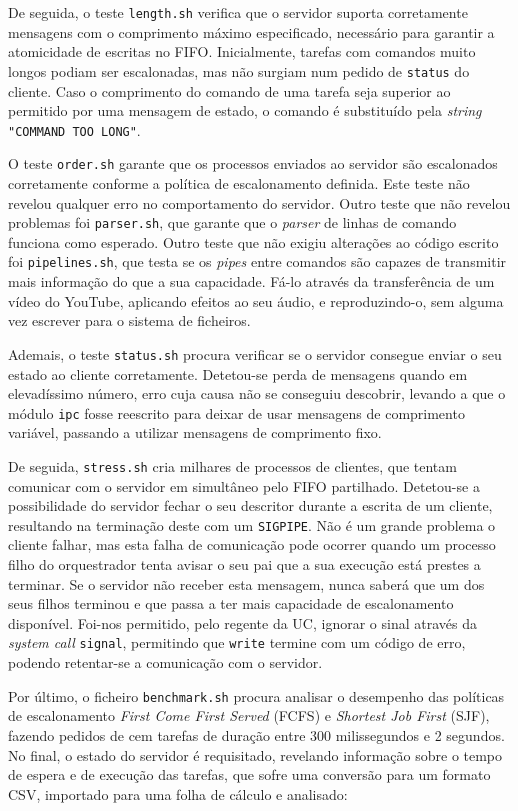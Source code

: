 \documentclass[11pt]{article}
\begin{document}
De seguida, o teste \texttt{length.sh} verifica que o servidor suporta corretamente mensagens com o
comprimento máximo especificado, necessário para garantir a atomicidade de escritas no FIFO.
Inicialmente, tarefas com comandos muito longos podiam ser escalonadas, mas não surgiam num pedido
de \texttt{status} do cliente. Caso o comprimento do comando de uma tarefa seja superior ao
permitido por uma mensagem de estado, o comando é substituído pela \emph{string}
\texttt{"COMMAND TOO LONG"}.

O teste \texttt{order.sh} garante que os processos enviados ao servidor são escalonados corretamente
conforme a política de escalonamento definida. Este teste não revelou qualquer erro no comportamento
do servidor. Outro teste que não revelou problemas foi \texttt{parser.sh}, que garante que o
\emph{parser} de linhas de comando funciona como esperado. Outro teste que não exigiu alterações ao
código escrito foi \texttt{pipelines.sh}, que testa se os \emph{pipes} entre comandos são capazes de
transmitir mais informação do que a sua capacidade. Fá-lo através da transferência de um vídeo do
YouTube, aplicando efeitos ao seu áudio, e reproduzindo-o, sem alguma vez escrever para o sistema de
ficheiros.

Ademais, o teste \texttt{status.sh} procura verificar se o servidor consegue enviar o seu estado ao
cliente corretamente. Detetou-se perda de mensagens quando em elevadíssimo número, erro cuja causa
não se conseguiu descobrir, levando a que o módulo \texttt{ipc} fosse reescrito para deixar de usar
mensagens de comprimento variável, passando a utilizar mensagens de comprimento fixo.

De seguida, \texttt{stress.sh} cria milhares de processos de clientes, que tentam comunicar com o
servidor em simultâneo pelo FIFO partilhado. Detetou-se a possibilidade do servidor fechar o seu
descritor durante a escrita de um cliente, resultando na terminação deste com um \texttt{SIGPIPE}.
Não é um grande problema o cliente falhar, mas esta falha de comunicação pode ocorrer quando um
processo filho do orquestrador tenta avisar o seu pai que a sua execução está prestes a terminar.
Se o servidor não receber esta mensagem, nunca saberá que um dos seus filhos terminou e que passa a
ter mais capacidade de escalonamento disponível. Foi-nos permitido, pelo regente da UC, ignorar o
sinal através da \emph{system call} \texttt{signal}, permitindo que \texttt{write} termine com um
código de erro, podendo retentar-se a comunicação com o servidor.

Por último, o ficheiro \texttt{benchmark.sh} procura analisar o desempenho das políticas de
escalonamento \emph{First Come First Served} (FCFS) e \emph{Shortest Job First} (SJF), fazendo
pedidos de cem tarefas de duração entre 300 milissegundos e 2 segundos. No final, o estado do
servidor é requisitado, revelando informação sobre o tempo de espera e de execução das tarefas, que
sofre uma conversão para um formato CSV, importado para uma folha de cálculo e analisado:
\end{document}
